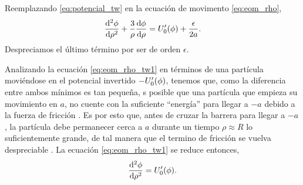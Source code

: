 Reemplazando \eqref{eq:potencial_tw} en la ecuación de movimento \eqref{eq:eom_rho},
\begin{equation} \label{eq:eom_rho_tw1}
\dv[2]{\phi}{\rho} + \frac{3}{\rho}\dv{\phi}{\rho} = U_0'\qty(\phi) + \frac{\epsilon}{2a}.
\end{equation}
Despreciamos el último término por ser de orden $\epsilon$. 

Analizando la ecuación \eqref{eq:eom_rho_tw1} en términos de una partícula moviéndose en el potencial invertido $-U_0'\qty(\phi)$, tenemos que, como la diferencia entre ambos mínimos es tan pequeña, s posible que una partícula que empieza su movimiento en $a$, no cuente con la suficiente ``energía'' para llegar a $-a$ debido a la fuerza de fricción  \cite{Masoumi:2015psa}. Es por esto que, antes de cruzar la barrera para llegar a $-a$, la partícula debe permanecer cerca a $a$ durante un tiempo $\rho \approx R$ lo suficientemente grande, de tal manera que el termino de fricción se vuelva despreciable \cite{weinberg2012classical}. 
La ecuación \eqref{eq:eom_rho_tw1} se reduce entonces,
\begin{equation} \label{eq:eom_rho_tw2}
\dv[2]{\phi}{\rho} = U_0'\qty(\phi).
\end{equation}

